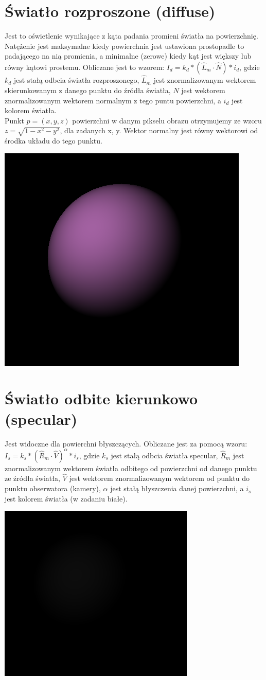 \documentclass[a4paper,11pt]{article}
\begin{document}
\section{Światło rozproszone (diffuse)}
Jest to oświetlenie wynikające z kąta padania promieni światła 
na powierzchnię. Natężenie jest maksymalne kiedy powierchnia jest 
ustawiona prostopadle to padającego na nią promienia, a minimalne 
(zerowe) kiedy kąt jest większy lub równy kątowi prostemu. Obliczane 
jest to wzorem: \(I_d = k_d * (\hat{L}_m  \cdot \hat{N} ) * i_d\), 
gdzie \(k_d\) jest stałą odbcia światła rozproszonego, \(\hat{L}_m\) jest 
znormalizowanym wektorem skierunkowanym z danego punktu do źródła 
światła, \(\hat{N}\) jest wektorem znormalizowanym wektorem normalnym 
z tego puntu powierzchni, a \(i_d\) jest kolorem światła. \\
Punkt \(p = (x, y, z)\) powierzchni w danym pikselu obrazu otrzymujemy 
ze wzoru \(z = \sqrt{1 - x^2 - y^2} \), dla zadanych x, y. Wektor 
normalny jest równy wektorowi od środka układu do tego punktu.
\begin{center}
    \includegraphics[width=0.3\columnwidth]{diffuse.png}
\end{center}

\section{Światło odbite kierunkowo (specular)}
Jest widoczne dla powierchni błyszczących. Obliczane jest za pomocą 
wzoru: \(I_s = k_s * (\hat{R}_m  \cdot \hat{V} )^\alpha * i_s\), 
gdzie \(k_s\) jest stałą odbcia światła specular, \(\hat{R}_m\) jest 
znormalizowanym wektorem światła odbitego od powierzchni od danego 
punktu ze źródła światła, \(\hat{V}\) jest wektorem znormalizowanym 
wektorem od punktu do punktu obserwatora (kamery), \(\alpha\) jest
stałą błyszczenia danej powierzchni, a \(i_s\) 
jest kolorem światła (w zadaniu białe).
\begin{center}
    \includegraphics[width=0.3\columnwidth]{specular.png}
\end{center}
\end{document}
